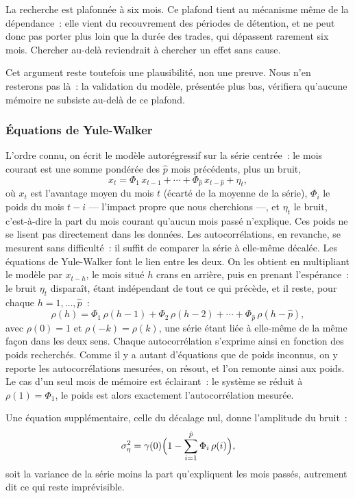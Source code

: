 La recherche est plafonnée à six mois. Ce plafond tient au mécanisme même de
la dépendance~: elle vient du recouvrement des périodes de détention, et ne
peut donc pas porter plus loin que la durée des trades, qui dépassent
rarement six mois. Chercher au-delà reviendrait à chercher un effet sans
cause.

Cet argument reste toutefois une plausibilité, non une preuve. Nous n'en
resterons pas là~: la validation du modèle, présentée plus bas, vérifiera
qu'aucune mémoire ne subsiste au-delà de ce plafond.

\subsubsection*{Équations de Yule-Walker}

L'ordre connu, on écrit le modèle autorégressif sur la série centrée~: le
mois courant est une somme pondérée des \(\hat p\) mois précédents, plus un
bruit,
\[
  x_t = \Phi_1\, x_{t-1} + \cdots + \Phi_{\hat p}\, x_{t-\hat p} + \eta_t ,
\]
où \(x_t\) est l'avantage moyen du mois \(t\) (écarté de la moyenne de la
série), \(\Phi_i\) le poids du mois \(t-i\) — l'impact propre que nous
cherchions —, et \(\eta_t\) le bruit, c'est-à-dire la part du mois courant
qu'aucun mois passé n'explique.
Ces poids ne se lisent pas directement dans les données. Les autocorrélations,
en revanche, se mesurent sans difficulté~: il suffit de comparer la série à
elle-même décalée. Les équations de Yule-Walker font le lien entre les deux.
On les obtient en multipliant le modèle par \(x_{t-h}\), le mois situé \(h\)
crans en arrière, puis en prenant l'espérance~: le bruit \(\eta_t\) disparaît,
étant indépendant de tout ce qui précède, et il reste, pour chaque
\(h = 1, \ldots, \hat p\)~:
\[
  \rho(h) = \Phi_1\,\rho(h-1) + \Phi_2\,\rho(h-2) + \cdots + \Phi_{\hat p}\,\rho(h-\hat p),
\]
avec \(\rho(0) = 1\) et \(\rho(-k) = \rho(k)\), une série étant liée à
elle-même de la même façon dans les deux sens. Chaque autocorrélation
s'exprime ainsi en fonction des poids recherchés. Comme il y a autant
d'équations que de poids inconnus, on y reporte les autocorrélations mesurées,
on résout, et l'on remonte ainsi aux poids. Le cas d'un seul mois de mémoire
est éclairant~: le système se réduit à \(\rho(1) = \Phi_1\), le poids est
alors exactement l'autocorrélation mesurée.

Une équation supplémentaire, celle du décalage nul, donne l'amplitude du
bruit~:
\[
  \sigma^2_\eta = \gamma(0)\Bigl(1 - \sum_{i=1}^{\hat p} \Phi_i\,\rho(i)\Bigr),
\]
soit la variance de la série moins la part qu'expliquent les mois passés,
autrement dit ce qui reste imprévisible.

